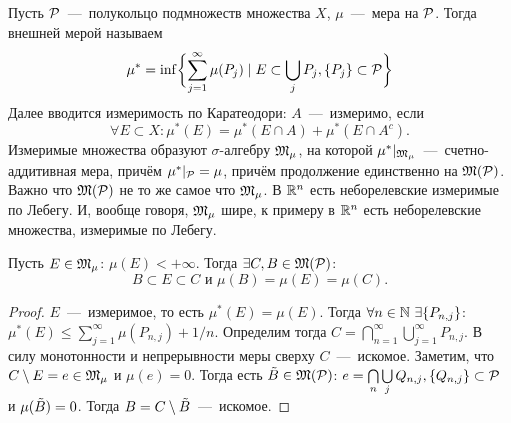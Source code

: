 \begin{reminder}
    Пусть $\mathcal{P}$~---~полукольцо подмножеств множества $X$, $\mu$~---~мера на $\mathcal{P}$. Тогда внешней мерой называем \[\mu^* = \inf \biggl\{\sum\limits_{j = 1}^\infty \mu(P_j) \mid E \subset \bigcup\limits_j P_j, \{P_j\} \subset \mathcal{P}\biggr\}\]
    Далее вводится измеримость по Каратеодори: $A$~---~измеримо, если \[\forall E \subset X: \mu^*(E) = \mu^*(E \cap A) + \mu^*(E \cap A^c).\]
    Измеримые множества образуют $\sigma$-алгебру $\mathfrak{M}_{\mu}$, на которой $\mu^* |_{\mathfrak{M}_{\mu}}$~---~счетно-аддитивная мера, причём $\mu^*|_{\mathcal{P}} = \mu$, причём продолжение единственно на $\mathfrak{M}(\mathcal{P})$. Важно что $\mathfrak{M}(\mathcal{P})$ не то же самое что  $\mathfrak{M}_{\mu}$. В $\mathbb{R}^n$ есть неборелевские измеримые по Лебегу. И, вообще говоря, $\mathfrak{M}_{\mu}$ шире, к примеру в $\mathbb{R}^n$ есть неборелевские множества, измеримые по Лебегу.
\end{reminder}
\begin{lemma}
    Пусть $E \in \mathfrak{M}_\mu$: $\mu (E) < +\infty$. Тогда $\exists C, B \in \mathfrak{M}(\mathcal{P})$: $$B \subset E \subset C \text{  и  } \mu(B) = \mu(E) = \mu(C).$$
\end{lemma}
\begin{proof}
    $E$~---~измеримое, то есть $\mu^*(E) = \mu(E)$.
    Тогда $\forall n \in \mathbb{N} \ \exists \{P_{n, j}\}$: $\mu^*(E) \leq \sum\limits_{j = 1}^\infty \mu(P_{n, j}) + 1/n$. Определим тогда $C = \bigcap\limits_{n = 1}^\infty\bigcup\limits_{j = 1}^\infty P_{n, j}$. В силу монотонности и непрерывности меры сверху $C$~---~искомое. Заметим, что $C \setminus E = e \in \mathfrak{M}_\mu$ и $\mu(e) = 0$. Тогда есть $\Tilde{B} \in \mathfrak{M}(\mathcal{P})$: $e = \bigcap\limits_n\bigcup\limits_j Q_{n, j}, \{Q_{n, j}\} \subset \mathcal{P}$ и $\mu(\Tilde{B}) = 0$. Тогда $B = C \setminus \Tilde{B}$~---~искомое.
\end{proof}

